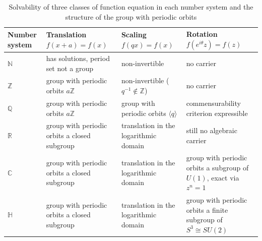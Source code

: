 \begin{table}[htbp]
\centering
\caption{Solvability of three classes of function equation in each number system and the structure of the group with periodic orbits}
\label{tab:function_equation_solvability}
\small
\renewcommand{\arraystretch}{1.25}
\begin{tabular}{@{}>{\raggedright\arraybackslash}p{1.55cm}>{\raggedright\arraybackslash}p{3.6cm}>{\raggedright\arraybackslash}p{3.5cm}>{\raggedright\arraybackslash}p{5.05cm}@{}}
\toprule
\textbf{Number system} & \textbf{Translation $f(x+a)=f(x)$} & \textbf{Scaling $f(qx)=f(x)$} & \textbf{Rotation $f(e^{i\theta}z)=f(z)$} \\
\midrule
$\mathbb{N}$ & has solutions, period set not a group & non-invertible & no carrier \\
$\mathbb{Z}$ & group with periodic orbits $a\mathbb{Z}$ & non-invertible ($q^{-1}\notin\mathbb{Z}$) & no carrier \\
$\mathbb{Q}$ & group with periodic orbits $a\mathbb{Z}$ & group with periodic orbits $\langle q\rangle$ & commensurability criterion expressible \\
$\mathbb{R}$ & group with periodic orbits a closed subgroup & translation in the logarithmic domain & still no algebraic carrier \\
$\mathbb{C}$ & group with periodic orbits a closed subgroup & translation in the logarithmic domain & group with periodic orbits a subgroup of $U(1)$, exact via $z^n=1$ \\
$\mathbb{H}$ & group with periodic orbits a closed subgroup & translation in the logarithmic domain & group with periodic orbits a finite subgroup of $S^3\cong SU(2)$ \\
\bottomrule
\end{tabular}
\end{table}

